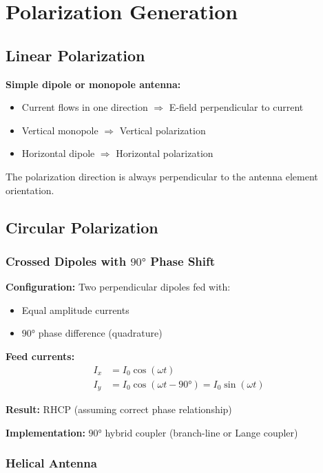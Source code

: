 \section{Polarization Generation}

\subsection{Linear Polarization}

\textbf{Simple dipole or monopole antenna:}
\begin{itemize}
\item Current flows in one direction $\Rightarrow$ E-field perpendicular to current
\item Vertical monopole $\Rightarrow$ Vertical polarization
\item Horizontal dipole $\Rightarrow$ Horizontal polarization
\end{itemize}

The polarization direction is always perpendicular to the antenna element orientation.

\subsection{Circular Polarization}

\subsubsection{Crossed Dipoles with $90°$ Phase Shift}

\textbf{Configuration:} Two perpendicular dipoles fed with:
\begin{itemize}
\item Equal amplitude currents
\item $90°$ phase difference (quadrature)
\end{itemize}

\textbf{Feed currents:}
\begin{align}
I_x &= I_0 \cos(\omega t) \label{eq:ix-feed} \\
I_y &= I_0 \cos(\omega t - 90°) = I_0 \sin(\omega t) \label{eq:iy-feed}
\end{align}

\textbf{Result:} RHCP (assuming correct phase relationship)

\textbf{Implementation:} $90°$ hybrid coupler (branch-line or Lange coupler)

\subsubsection{Helical Antenna}

